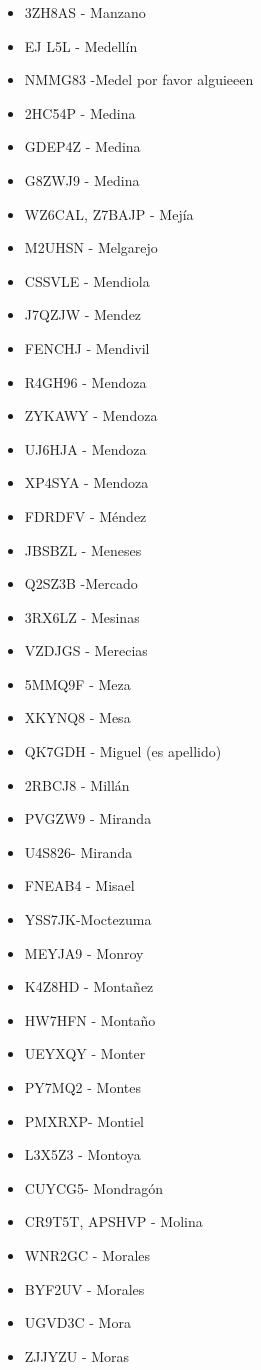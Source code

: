 \begin{itemize}[leftmargin=*,nosep]
\item 3ZH8AS - Manzano
\item EJ L5L  -  Medellín
\item NMMG83 -Medel  por favor alguieeen
\item 2HC54P - Medina
\item GDEP4Z - Medina
\item G8ZWJ9 - Medina
\item WZ6CAL, Z7BAJP - Mejía
\item M2UHSN - Melgarejo
\item CSSVLE - Mendiola
\item J7QZJW - Mendez
\item FENCHJ - Mendivil
\item R4GH96 - Mendoza
\item ZYKAWY  -  Mendoza
\item UJ6HJA  -  Mendoza
\item XP4SYA - Mendoza
\item FDRDFV - Méndez
\item JBSBZL - Meneses
\item Q2SZ3B -Mercado
\item 3RX6LZ - Mesinas
\item VZDJGS - Merecias
\item 5MMQ9F  -  Meza
\item XKYNQ8 - Mesa
\item QK7GDH - Miguel (es apellido)
\item 2RBCJ8  -  Millán
\item PVGZW9 - Miranda
\item U4S826- Miranda
\item FNEAB4 - Misael
\item YSS7JK-Moctezuma
\item MEYJA9  -  Monroy
\item K4Z8HD  -  Montañez
\item HW7HFN  -  Montaño
\item UEYXQY - Monter
\item PY7MQ2 - Montes
\item PMXRXP- Montiel
\item L3X5Z3 - Montoya
\item CUYCG5- Mondragón
\item CR9T5T, APSHVP - Molina
\item WNR2GC  -  Morales
\item BYF2UV - Morales
\item UGVD3C - Mora
\item ZJJYZU - Moras

\end{itemize}
